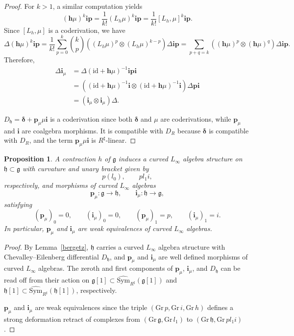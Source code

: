 \documentclass[12pt]{amsart}
\newtheorem{prop}[defn]{Proposition}
\numberwithin{equation}{section}
\theoremstyle{plain}
\newcommand{\bfi}{\mathbf{i}}
\newcommand{\bfh}{\mathbf{h}}
\newcommand{\bfp}{\mathbf{p}}
\newcommand{\bfdelta}{\bm{\delta}}
\newcommand{\fg}{\mathfrak{g}}
\newcommand{\fh}{\mathfrak{h}}
\newcommand{\Sym}{\mathrm{Sym}}
\newcommand{\Gr}{\mathrm{Gr}}
\newcommand{\id}{\mathrm{id}}
\newcommand{\uR}{{R^\sharp}}
\begin{document}
\begin{proof}
		For $k > 1$, a similar computation yields 
		\[
		(\bfh \mu)^k \bfi \bfp = \frac{1}{k!} (L_h \mu)^k\bfi \bfp = \frac{1}{k!}  [L_h, \mu]^k\bfi \bfp.
		\]
		Since $[L_h, \mu]$ is a coderivation, we have
		\[
		\Delta (\bfh \mu)^k \bfi \bfp = \frac{1}{k!} \sum_{p=0}^k \binom{k}{p}\left((L_h \mu)^p \otimes (L_h \mu)^{k-p} \right) \Delta \bfi \bfp = \sum_{p+q=k}\left((\bfh \mu)^p \otimes (\bfh\mu)^q \right) \Delta \bfi \bfp.
		\]
		Therefore,
		\begin{align*}
			\Delta\bfi_\mu
			&=\Delta(\id+\bfh\mu)^{-1} \bfi \bfp \bfi\\
			&= \left((\id+\bfh\mu)^{-1}\bfi \otimes (\id+\bfh\mu)^{-1}\bfi \right) \Delta  \bfp \bfi \\
			&= \left(\bfi_\mu \otimes \bfi_\mu \right) \Delta.
		\end{align*}
		
		$D_\fh = \bfdelta + \bfp_\mu \mu \bfi$ is a coderivation since both $\bfdelta$ and $\mu$ are coderivations, while $\bfp_{\mu}$ and $\bfi$ are coalgebra morphisms. It is compatible with $D_R$ because $\bfdelta$ is compatible with $D_R$, and the term $\bfp_{\mu} \mu \bfi$ is $\uR$-linear.
	\end{proof}
	
	\begin{prop}\label{thht}
		A contraction $h$ of $\fg$ induces a curved $L_\infty$ algebra structure on $\fh \subset \fg$ with curvature and unary bracket given by
		\[
		p(l_0), \qquad p l_1i,
		\]
		respectively, and morphisms of curved $L_\infty$ algebras
		\[
		\bfp_\mu\colon \fg \to \fh,
		\qquad
		\bfi_\mu\colon \fh \to \fg,
		\]
		satisfying
		\[
		(\bfp_\mu)_0 = 0,
		\qquad
		(\bfi_\mu)_0 = 0,
		\qquad
		(\bfp_\mu)_1 = p,
		\qquad
		(\bfi_\mu)_1 = i.
		\]
		In particular, $\bfp_\mu$ and $\bfi_\mu$ are weak equivalences of curved $L_\infty$ algebras.
	\end{prop}
	\begin{proof}
		By Lemma~\ref{bergetz}, $\fh$ carries a curved $L_\infty$ algebra structure with Chevalley--Eilenberg differential $D_\fh$, and $\bfp_\mu$ and $\bfi_\mu$ are well defined morphisms of curved $L_\infty$ algebras. The zeroth and first components of $\bfp_\mu$, $\bfi_\mu$, and $D_\fh$ can be read off from their action on $\fg[1]\subset \widehat{\Sym}_\uR(\fg[1])$ and $\fh[1]\subset \widehat{\Sym}_\uR(\fh[1])$, respectively.
		
		$\bfp_\mu$ and $\bfi_\mu$ are weak equivalences since the triple $(\Gr\,p, \Gr\,i, \Gr\,h)$ defines a strong deformation retract of complexes from $(\Gr\,\fg,\Gr\,l_1)$ to $(\Gr\,\fh,\Gr\,pl_1i)$.
	\end{proof}
	
\end{document}
